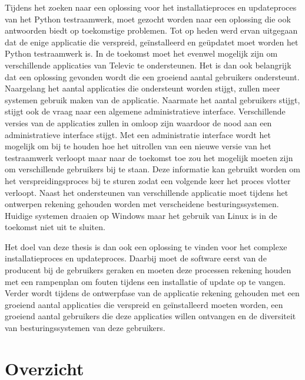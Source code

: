 Tijdens het zoeken naar een oplossing voor het installatieproces en updateproces van het Python testraamwerk, moet gezocht worden naar een oplossing die ook antwoorden biedt op toekomstige problemen.
Tot op heden werd ervan uitgegaan dat de enige applicatie die verspreid, geïnstalleerd en geüpdatet moet worden het Python testraamwerk is.
In de toekomst moet het evenwel mogelijk zijn om verschillende applicaties van Televic te ondersteunen.
Het is dan ook belangrijk dat een oplossing gevonden wordt die een groeiend aantal gebruikers ondersteunt.
Naargelang het aantal applicaties die ondersteunt worden stijgt, zullen meer systemen gebruik maken van de applicatie.
Naarmate het aantal gebruikers stijgt, stijgt ook de vraag naar een algemene administratieve interface.
Verschillende versies van de applicaties zullen in omloop zijn waardoor de nood aan een administratieve interface stijgt. 
Met een administratie interface wordt het mogelijk om bij te houden hoe het uitrollen van een nieuwe versie van het testraamwerk verloopt maar naar de toekomst toe zou het mogelijk moeten zijn om verschillende gebruikers bij te staan.
Deze informatie kan gebruikt worden om het verspreidingsproces bij te sturen zodat een volgende keer het proces vlotter verloopt.
Naast het ondersteunen van verschillende applicatie moet tijdens het ontwerpen rekening gehouden worden met verscheidene besturingssystemen.
Huidige systemen draaien op Windows maar het gebruik van Linux is in de toekomst niet uit te sluiten.

Het doel van deze thesis is dan ook een oplossing te vinden voor het complexe installatieproces en updateproces.
Daarbij moet de software eerst van de producent bij de gebruikers geraken en moeten deze processen rekening houden met een rampenplan om fouten tijdens een installatie of update op te vangen.
Verder wordt tijdens de ontwerpfase van de applicatie rekening gehouden met een groeiend aantal applicaties die verspreid en geïnstalleerd moeten worden, een groeiend aantal gebruikers die deze applicaties willen ontvangen en de diversiteit van besturingssystemen van deze gebruikers.

\section{Overzicht}
